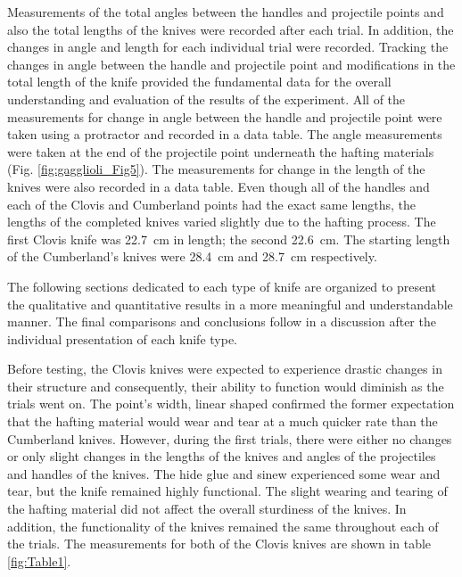 Measurements of the total angles between the handles and projectile points and also the total lengths of the knives were recorded after each trial. In addition, the changes in angle and length for each individual trial were recorded. 
Tracking the changes in angle between the handle and projectile point and modifications in the total length of the knife provided the fundamental data for the overall understanding and evaluation of the results of the experiment. All of the measurements for change in angle between the handle and projectile point were taken using a protractor and recorded in a data table. The angle measurements were taken at the end of the projectile point underneath the hafting materials (Fig. \ref{fig:gagglioli_Fig5}). 
The measurements for change in the length of the knives were also recorded in a data table. Even though all of the handles and each of the Clovis and Cumberland points had the exact same lengths, the lengths of the completed knives varied slightly due to the hafting process. The first Clovis knife was \SI{22.7}{\centi\metre} in length; the second \SI{22.6}{\centi\metre}. The starting length of the Cumberland’s knives were \SI{28.4}{\centi\metre} and \SI{28.7}{\centi\metre} respectively.


The following sections dedicated to each type of knife are organized to present the qualitative and quantitative results in a more meaningful and understandable manner. The final comparisons and conclusions follow in a discussion after the individual presentation of each knife type. 

Before testing, the Clovis knives were expected to experience drastic changes in their structure and consequently, their ability to function would diminish as the trials went on. The point’s width, linear shaped confirmed the former expectation that the hafting material would wear and tear at a much quicker rate than the Cumberland knives. However, during the first trials, there were either no changes or only slight changes in the lengths of the knives and angles of the projectiles and handles of the knives. The hide glue and sinew experienced some wear and tear, but the knife remained highly functional. The slight wearing and tearing of the hafting material did not affect the overall sturdiness of the knives. In addition, the functionality of the knives remained the same throughout each of the trials. The measurements for both of the Clovis knives are shown in table \ref{fig:Table1}.

